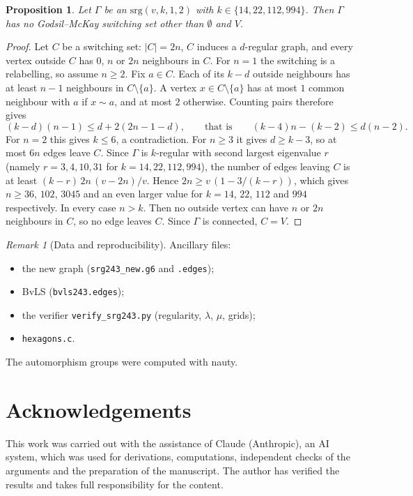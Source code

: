 \documentclass[11pt]{amsart}
\newtheorem{proposition}[theorem]{Proposition}
\theoremstyle{remark}
\newtheorem{remark}[theorem]{Remark}
\begin{document}
\begin{proposition}\label{prop:gm}
Let $\Gamma$ be an $\mathrm{srg}(v,k,1,2)$ with $k\in\{14,22,112,994\}$. Then $\Gamma$ has no Godsil--McKay switching set
other than $\emptyset$ and $V$.
\end{proposition}
\begin{proof}
Let $C$ be a switching set: $|C|=2n$, $C$ induces a $d$-regular graph, and every vertex outside $C$ has $0$, $n$ or $2n$
neighbours in $C$. For $n=1$ the switching is a relabelling, so assume $n\ge2$. Fix $a\in C$. Each of its $k-d$ outside
neighbours has at least $n-1$ neighbours in $C\setminus\{a\}$. A vertex $x\in C\setminus\{a\}$ has at most $1$ common
neighbour with $a$ if $x\sim a$, and at most $2$ otherwise. Counting pairs therefore gives
\[
(k-d)(n-1)\le d+2(2n-1-d),\qquad\text{that is}\qquad (k-4)n-(k-2)\le d(n-2).
\]
For $n=2$ this gives $k\le6$, a contradiction. For $n\ge3$ it gives $d\ge k-3$, so at most $6n$ edges leave $C$. Since
$\Gamma$ is $k$-regular with second largest eigenvalue $r$ (namely $r=3,4,10,31$ for $k=14,22,112,994$), the
number of edges leaving $C$ is at least $(k-r)\,2n\,(v-2n)/v$. Hence $2n\ge v\,(1-3/(k-r))$, which gives $n\ge36$, $102$, $3045$ and an even larger value for
$k=14$, $22$, $112$ and $994$ respectively. In every case $n>k$. Then no outside vertex can have $n$ or $2n$ neighbours in
$C$, so no edge leaves $C$. Since $\Gamma$ is connected, $C=V$.
\end{proof}

\begin{remark}[Data and reproducibility]
Ancillary files:
\begin{itemize}
\item the new graph (\texttt{srg243\_new.g6} and \texttt{.edges});
\item BvLS (\texttt{bvls243.edges});
\item the verifier \texttt{verify\_srg243.py} (regularity, $\lambda$, $\mu$, grids);
\item \texttt{hexagons.c}.
\end{itemize}
The automorphism groups were computed with nauty.
\end{remark}

\section*{Acknowledgements}
This work was carried out with the assistance of Claude (Anthropic), an AI system, which was used for derivations, computations, independent checks of the arguments and the preparation of the manuscript. The author has verified the results and takes full responsibility for the content.
\end{document}
